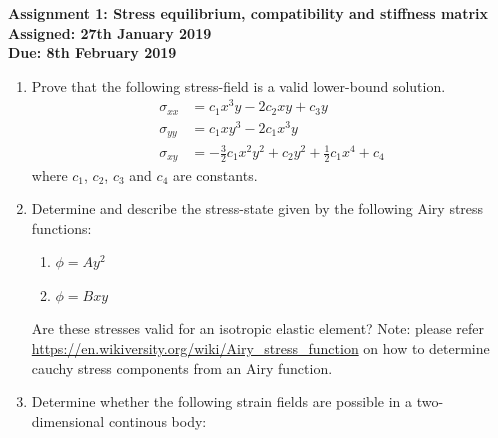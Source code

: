 \documentclass[a4paper,12pt]{article}
\begin{document}
\begin{centering}
	\textbf{
		Assignment 1: Stress equilibrium, compatibility and stiffness matrix\\
		Assigned: 27th January 2019\\
		Due: 8th February 2019\\
	}
\end{centering}

\vspace{1em}
 
\begin{enumerate}
	\item Prove that the following stress-field is a valid lower-bound solution.
	\begin{align*}
		\sigma_{xx} & = c_1 x^3 y - 2c_2 xy + c_3 y\\
		\sigma_{yy} & = c_1 x y^3 - 2c_1 x^3 y\\
		\sigma_{xy} & = -\frac{3}{2}c_1x^2y^2 + c_2 y^2 + \frac{1}{2}c_1 x^4 + c_4
	\end{align*}
	where $c_1$, $c_2$, $c_3$ and $c_4$ are constants.

	\item Determine and describe the stress-state given by the following Airy stress functions:
	\begin{enumerate}
		\item $\phi = Ay^2$ 
		\item $\phi = Bxy$
	\end{enumerate}
	Are these stresses valid for an isotropic elastic element? Note: please refer \url{https://en.wikiversity.org/wiki/Airy_stress_function} on how to determine cauchy stress components from an Airy function.

	\item Determine whether the following strain fields are possible in a two-dimensional continous body:
	

\end{enumerate}
\end{document}
